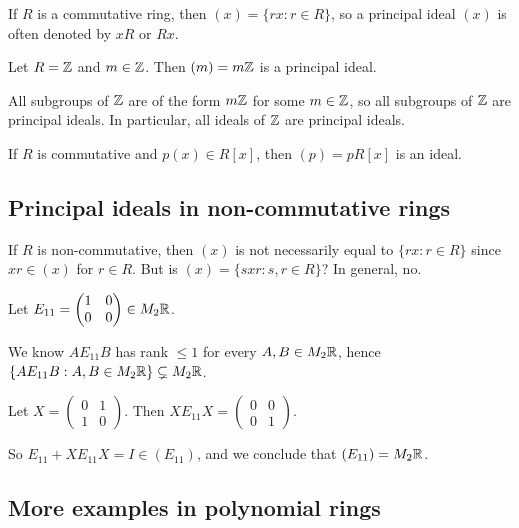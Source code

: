 \documentclass[12pt,letterpaper]{report}
\begin{document}
If $R$ is a commutative ring, then $(x) = \{rx : r \in R\}$, so a principal ideal $(x)$ is often
denoted by $xR$ or $Rx$.

\begin{ex}
  Let $R = \mathbb{Z}$ and $m \in \mathbb{Z}$.
  Then $(m) = m\mathbb{Z}$ is a principal ideal.

  All subgroups of $\mathbb{Z}$ are of the form $m\mathbb{Z}$ for some $m \in \mathbb{Z}$, so all subgroups of $\mathbb{Z}$ are
  principal ideals.
  In particular, all ideals of $\mathbb{Z}$ are principal ideals.
\end{ex}

\begin{ex}
  If $R$ is commutative and $p(x) \in R[x]$, then $(p) = pR[x]$ is an ideal.
\end{ex}

\pagebreak
\subsection{Principal ideals in non-commutative rings}

If $R$ is non-commutative, then $(x)$ is not necessarily equal to $\{rx : r \in R\}$ since
$xr \in (x)$ for $r \in R$.
But is $(x) = \{sxr : s, r \in R\}$?
In general, no.

\begin{ex}
  Let $E_{11} = \begin{pmatrix} 1 & 0 \\ 0 & 0 \end{pmatrix} \in M_2\mathbb{R}$.

  We know $AE_{11}B$ has rank $\leq 1$ for every $A, B \in M_2\mathbb{R}$, hence
  $\{AE_{11}B : A, B \in M_2\mathbb{R}\} \subsetneq M_2\mathbb{R}$.

  Let $X = \begin{pmatrix} 0 & 1 \\ 1 & 0 \end{pmatrix}$.
  Then $XE_{11}X = \begin{pmatrix} 0 & 0 \\ 0 & 1 \end{pmatrix}$.

  So $E_{11} + XE_{11}X = I \in (E_{11})$, and we conclude that $(E_{11}) = M_2\mathbb{R}$.
\end{ex}

\pagebreak
\subsection{More examples in polynomial rings}
\end{document}
